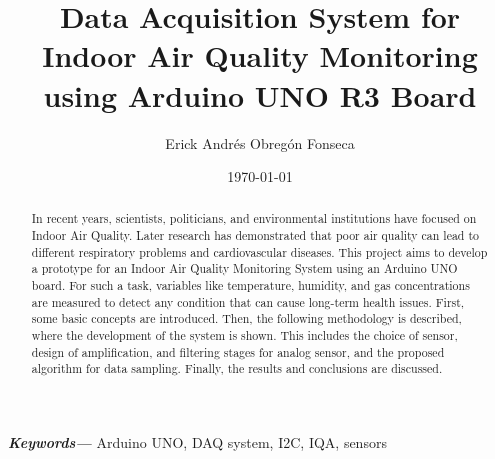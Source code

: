 \documentclass[10pt,a4paper]{article}
\providecommand{\keywords}[1]
{
  \small	
  \textbf{\textit{Keywords---}} #1
}
\begin{document}
\title{Data Acquisition System for Indoor Air Quality Monitoring using Arduino UNO R3 Board}
\author{Erick Andrés Obregón Fonseca}
\date{\today}
\maketitle




\begin{abstract}
\normalsize
In recent years, scientists, politicians, and environmental institutions have
focused on Indoor Air Quality. Later research has demonstrated that poor air
quality can lead to different respiratory problems and cardiovascular
diseases. This project aims to develop a prototype for an Indoor Air Quality
Monitoring System using an Arduino UNO board. For such a task, variables like
temperature, humidity, and gas concentrations are measured to detect any
condition that can cause long-term health issues. First, some basic concepts
are introduced. Then, the following methodology is described, where the
development of the system is shown. This includes the choice of sensor, design
of amplification, and filtering stages for analog sensor, and the proposed
algorithm for data sampling. Finally, the results and conclusions are
discussed.
\end{abstract}

\keywords{Arduino UNO, DAQ system, I2C, IQA, sensors}

\setcounter{tocdepth}{2}
\tableofcontents


\clearpage






\clearpage



\clearpage
{}

\end{document}
